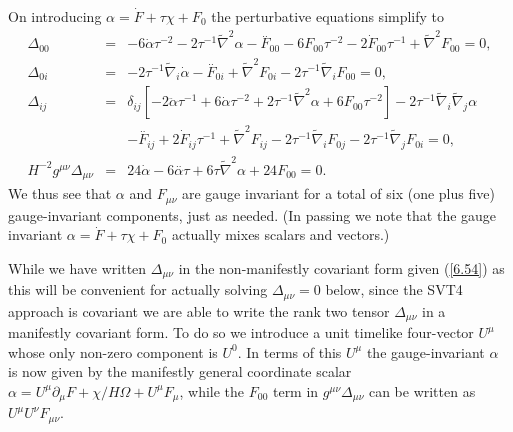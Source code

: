 On introducing $\alpha=\dot{F}+\tau\chi+F_0$ the perturbative equations simplify to 
%
\begin{eqnarray}
\Delta_{00}&=& -6 \dot{\alpha} \tau^{-2} - 2 \tau^{-1} \tilde{\nabla}^2\alpha - \overset{..}{F}_{00}  - 6 F_{00} \tau^{-2} - 2 \dot{F}_{00} \tau^{-1} + \tilde{\nabla}^2F_{00}=0,
\nonumber\\ 
\Delta_{0i}&=& -2 \tau^{-1} \tilde{\nabla}_{i}\dot{\alpha}- \overset{..}{F}_{0i} +  \tilde{\nabla}^2F_{0i} - 2 \tau^{-1} \tilde{\nabla}_{i}F_{00}=0,
\nonumber\\ 
\Delta_{ij}&=&\delta_{ij} \left[- 2 \ddot{\alpha}\tau^{-1}+  6 \dot{\alpha} \tau^{-2}  + 2\tau^{-1} \tilde{\nabla}^2\alpha + 6 F_{00} \tau^{-2}\right]-2\tau^{-1} \tilde{\nabla}_{i}\tilde{\nabla}_{j}\alpha
\nonumber\\
&& - \overset{..}{F}_{ij}  + 2 \dot{F}_{ij} \tau^{-1} + \tilde{\nabla}^2F_{ij} -2 \tau^{-1} \tilde{\nabla}_{i}F_{0j} - 2 \tau^{-1} \tilde{\nabla}_{j}F_{0i}=0,
\nonumber\\
H^{-2}g^{\mu\nu}\Delta_{\mu\nu} &=& 24\dot{\alpha} - 6  \overset{..}{\alpha} \tau + 6  \tau \tilde{\nabla}^2\alpha +24 F_{00}=0.
\label{6.54}
\end{eqnarray}
%
We thus see that $\alpha$ and $F_{\mu\nu}$ are gauge invariant for a total of six (one plus five) gauge-invariant components, just as needed. (In passing we note that the gauge invariant  $\alpha=\dot{F}+\tau\chi+F_0$ actually mixes scalars and vectors.)

While we have written $\Delta_{\mu\nu}$ in the non-manifestly covariant form given (\ref{6.54}) as this will be convenient for actually solving $\Delta_{\mu\nu}=0$ below, since the SVT4 approach is covariant we are able to write the rank two  tensor $\Delta_{\mu\nu}$ in a manifestly covariant form. To do so we introduce a unit  timelike four-vector $U^{\mu}$ whose only non-zero component is $U^{0}$. In terms of this $U^{\mu}$ the gauge-invariant $\alpha$ is now given by the manifestly general coordinate scalar $\alpha=U^{\mu}\partial_{\mu}F+\chi/H\Omega+U^{\mu}F_{\mu}$, while the $F_{00}$ term in $g^{\mu\nu}\Delta_{\mu\nu}$ can be written as $U^{\mu}U^{\nu}F_{\mu\nu}$.


